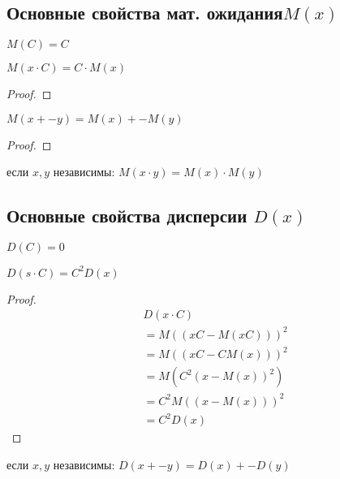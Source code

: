     \subsection{Основные свойства мат. ожидания\(M(x)\)}
    \begin{sv}
        \(M(C) = C\)
    \end{sv}
    \begin{sv}
        \(M(x\cdot C) = C\cdot M(x)\)
        \begin{proof}
            
        \end{proof}
    \end{sv}
    \begin{sv}
        \(M(x +- y) = M(x) +- M(y)\)
        \begin{proof}
            
        \end{proof}
    \end{sv}
    \begin{sv}
        если \(x, y\) независимы: \(M(x\cdot y) = M(x)\cdot M(y)\)
    \end{sv}


    \subsection{Основные свойства дисперсии \(D(x)\)}
    \begin{sv}
        \(D(C) = 0\)
    \end{sv}
    \begin{sv}
        \(D(s\cdot C) = C^{2} D(x)\)
        \begin{proof}
            \begin{equation}
                \begin{align*}
                    &D(x\cdot C) \\
                    &= M((xC - M(xC)))^{2} \\
                    &= M((xC - CM(x)))^{2} \\
                    &= M(C^{2}(x - M(x))^{2}) \\
                    &= C^{2}M((x - M(x)))^{2} \\
                    &= C^{2}D(x)
                \end{align*}
            \end{equation}
        \end{proof}
    \end{sv}
    \begin{sv}
        если \(x, y\) независимы: \(D(x +- y) = D(x) +- D(y)\)
    \end{sv}



